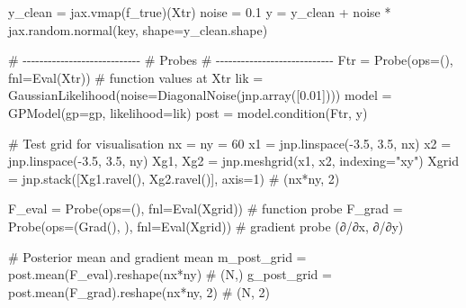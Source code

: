 \documentclass[
  letterpaper,
  DIV=11,
  numbers=noendperiod]{scrartcl}
\newenvironment{Shaded}{\begin{snugshade}}{\end{snugshade}}
\newcommand{\CommentTok}[1]{\textcolor[rgb]{0.37,0.37,0.37}{#1}}
\newcommand{\DecValTok}[1]{\textcolor[rgb]{0.68,0.00,0.00}{#1}}
\newcommand{\FloatTok}[1]{\textcolor[rgb]{0.68,0.00,0.00}{#1}}
\newcommand{\NormalTok}[1]{\textcolor[rgb]{0.00,0.23,0.31}{#1}}
\newcommand{\OperatorTok}[1]{\textcolor[rgb]{0.37,0.37,0.37}{#1}}
\newcommand{\StringTok}[1]{\textcolor[rgb]{0.13,0.47,0.30}{#1}}
\begin{document}
\begin{Shaded}
\begin{Highlighting}[]
\NormalTok{y\_clean }\OperatorTok{=}\NormalTok{ jax.vmap(f\_true)(Xtr)}
\NormalTok{noise   }\OperatorTok{=} \FloatTok{0.1}
\NormalTok{y       }\OperatorTok{=}\NormalTok{ y\_clean }\OperatorTok{+}\NormalTok{ noise }\OperatorTok{*}\NormalTok{ jax.random.normal(key, shape}\OperatorTok{=}\NormalTok{y\_clean.shape)}

\CommentTok{\# {-}{-}{-}{-}{-}{-}{-}{-}{-}{-}{-}{-}{-}{-}{-}{-}{-}{-}{-}{-}{-}{-}{-}{-}{-}{-}{-}{-}}
\CommentTok{\# Probes}
\CommentTok{\# {-}{-}{-}{-}{-}{-}{-}{-}{-}{-}{-}{-}{-}{-}{-}{-}{-}{-}{-}{-}{-}{-}{-}{-}{-}{-}{-}{-}}
\NormalTok{Ftr   }\OperatorTok{=}\NormalTok{ Probe(ops}\OperatorTok{=}\NormalTok{(), fnl}\OperatorTok{=}\NormalTok{Eval(Xtr))                 }\CommentTok{\# function values at Xtr}
\NormalTok{lik   }\OperatorTok{=}\NormalTok{ GaussianLikelihood(noise}\OperatorTok{=}\NormalTok{DiagonalNoise(jnp.array([}\FloatTok{0.01}\NormalTok{])))}
\NormalTok{model }\OperatorTok{=}\NormalTok{ GPModel(gp}\OperatorTok{=}\NormalTok{gp, likelihood}\OperatorTok{=}\NormalTok{lik)}
\NormalTok{post  }\OperatorTok{=}\NormalTok{ model.condition(Ftr, y)}

\CommentTok{\# Test grid for visualisation}
\NormalTok{nx }\OperatorTok{=}\NormalTok{ ny }\OperatorTok{=} \DecValTok{60}
\NormalTok{x1 }\OperatorTok{=}\NormalTok{ jnp.linspace(}\OperatorTok{{-}}\FloatTok{3.5}\NormalTok{, }\FloatTok{3.5}\NormalTok{, nx)}
\NormalTok{x2 }\OperatorTok{=}\NormalTok{ jnp.linspace(}\OperatorTok{{-}}\FloatTok{3.5}\NormalTok{, }\FloatTok{3.5}\NormalTok{, ny)}
\NormalTok{Xg1, Xg2 }\OperatorTok{=}\NormalTok{ jnp.meshgrid(x1, x2, indexing}\OperatorTok{=}\StringTok{"xy"}\NormalTok{)}
\NormalTok{Xgrid }\OperatorTok{=}\NormalTok{ jnp.stack([Xg1.ravel(), Xg2.ravel()], axis}\OperatorTok{=}\DecValTok{1}\NormalTok{)     }\CommentTok{\# (nx*ny, 2)}

\NormalTok{F\_eval  }\OperatorTok{=}\NormalTok{ Probe(ops}\OperatorTok{=}\NormalTok{(), fnl}\OperatorTok{=}\NormalTok{Eval(Xgrid))                  }\CommentTok{\# function probe}
\NormalTok{F\_grad  }\OperatorTok{=}\NormalTok{ Probe(ops}\OperatorTok{=}\NormalTok{(Grad(), ), fnl}\OperatorTok{=}\NormalTok{Eval(Xgrid))  }\CommentTok{\# gradient probe (∂/∂x, ∂/∂y)}

\CommentTok{\# Posterior mean and gradient mean}
\NormalTok{m\_post\_grid }\OperatorTok{=}\NormalTok{ post.mean(F\_eval).reshape(nx}\OperatorTok{*}\NormalTok{ny)            }\CommentTok{\# (N,)}
\NormalTok{g\_post\_grid }\OperatorTok{=}\NormalTok{ post.mean(F\_grad).reshape(nx}\OperatorTok{*}\NormalTok{ny, }\DecValTok{2}\NormalTok{)         }\CommentTok{\# (N, 2)}
\end{Highlighting}
\end{Shaded}
\end{document}
